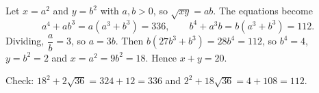 Let $x=a^2$ and $y=b^2$ with $a,b>0$, so $\sqrt{xy}=ab$. The equations become
\[
a^4+ab^3=a(a^3+b^3)=336,\qquad b^4+a^3b=b(a^3+b^3)=112 .
\]
Dividing, $\dfrac {a}{b}=3$, so $a=3b$. Then $b(27b^3+b^3)=28b^4=112$, so $b^4=4$, $y=b^2=2$ and $x=a^2=9b^2=18$. Hence $x+y=\boxed{20}$.

Check: $18^2+2\sqrt{36}=324+12=336$ and $2^2+18\sqrt{36}=4+108=112$.
